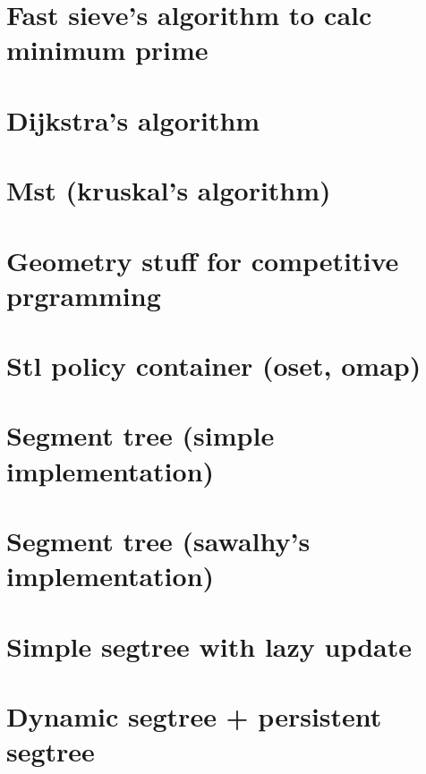 \section{Fast sieve's algorithm to calc minimum prime}
\raggedbottom

\section{Dijkstra's algorithm}
\raggedbottom

\section{Mst (kruskal's algorithm)}
\raggedbottom

\section{Geometry stuff for competitive prgramming}
\raggedbottom

\section{Stl policy container (oset, omap)}
\raggedbottom

\section{Segment tree (simple implementation)}
\raggedbottom

\section{Segment tree (sawalhy's implementation)}
\raggedbottom

\section{Simple segtree with lazy update}
\raggedbottom

\section{Dynamic segtree + persistent segtree}
\raggedbottom

